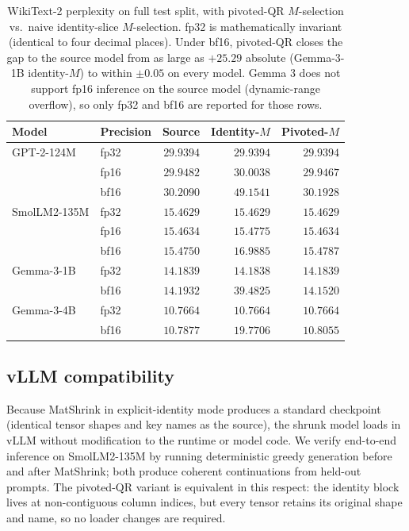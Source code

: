 \documentclass{article}
\begin{document}
\begin{table}[h!] \centering
\caption{WikiText-2 perplexity on full test split, with pivoted-QR $M$-selection vs.\ naive identity-slice $M$-selection. fp32 is mathematically invariant (identical to four decimal places). Under bf16, pivoted-QR closes the gap to the source model from as large as $+25.29$ absolute (Gemma-3-1B identity-$M$) to within $\pm 0.05$ on every model. Gemma 3 does not support fp16 inference on the source model (dynamic-range overflow), so only fp32 and bf16 are reported for those rows.}
\label{tab:matshrink-bf16}
\begin{tabular}{l l r r r}
\hline
Model & Precision & Source & Identity-$M$ & Pivoted-$M$ \\
\hline
GPT-2-124M   & fp32 & $29.9394$ & $29.9394$ & $29.9394$ \\
             & fp16 & $29.9482$ & $30.0038$ & $29.9467$ \\
             & bf16 & $30.2090$ & $49.1541$ & $\mathbf{30.1928}$ \\
\hline
SmolLM2-135M & fp32 & $15.4629$ & $15.4629$ & $15.4629$ \\
             & fp16 & $15.4634$ & $15.4775$ & $15.4634$ \\
             & bf16 & $15.4750$ & $16.9885$ & $\mathbf{15.4787}$ \\
\hline
Gemma-3-1B   & fp32 & $14.1839$ & $14.1838$ & $14.1839$ \\
             & bf16 & $14.1932$ & $39.4825$ & $\mathbf{14.1520}$ \\
\hline
Gemma-3-4B   & fp32 & $10.7664$ & $10.7664$ & $10.7664$ \\
             & bf16 & $10.7877$ & $19.7706$ & $\mathbf{10.8055}$ \\
\hline
\end{tabular}
\end{table}

\subsection{vLLM compatibility}

Because MatShrink in explicit-identity mode produces a standard checkpoint (identical tensor shapes and key names as the source), the shrunk model loads in vLLM \citep{vLLM} without modification to the runtime or model code. We verify end-to-end inference on SmolLM2-135M by running deterministic greedy generation before and after MatShrink; both produce coherent continuations from held-out prompts. The pivoted-QR variant is equivalent in this respect: the identity block lives at non-contiguous column indices, but every tensor retains its original shape and name, so no loader changes are required.
\end{document}
